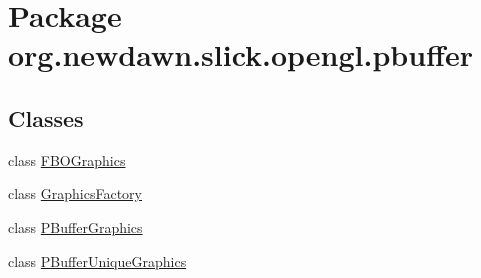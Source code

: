 \hypertarget{namespaceorg_1_1newdawn_1_1slick_1_1opengl_1_1pbuffer}{}\section{Package org.\+newdawn.\+slick.\+opengl.\+pbuffer}
\label{namespaceorg_1_1newdawn_1_1slick_1_1opengl_1_1pbuffer}
\subsection*{Classes}
\begin{DoxyCompactItemize}
\item 
class \mbox{\hyperlink{classorg_1_1newdawn_1_1slick_1_1opengl_1_1pbuffer_1_1_f_b_o_graphics}{F\+B\+O\+Graphics}}
\item 
class \mbox{\hyperlink{classorg_1_1newdawn_1_1slick_1_1opengl_1_1pbuffer_1_1_graphics_factory}{Graphics\+Factory}}
\item 
class \mbox{\hyperlink{classorg_1_1newdawn_1_1slick_1_1opengl_1_1pbuffer_1_1_p_buffer_graphics}{P\+Buffer\+Graphics}}
\item 
class \mbox{\hyperlink{classorg_1_1newdawn_1_1slick_1_1opengl_1_1pbuffer_1_1_p_buffer_unique_graphics}{P\+Buffer\+Unique\+Graphics}}
\end{DoxyCompactItemize}
